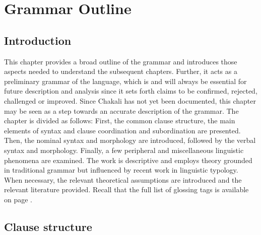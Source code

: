 \chapter{Grammar Outline}
\label{sec:gramsketch}


\section{Introduction}
\label{sec:Introduction}


This chapter  provides a broad outline of the grammar and introduces those
aspects needed to understand the subsequent chapters. Further, it acts as a
preliminary grammar of the language, which is and will always be essential for
future description and analysis since it sets forth claims to be confirmed,
rejected, challenged or improved.  Since Chakali  has not yet been  documented,
this chapter may be seen as a step towards an accurate description of the 
grammar. The chapter is divided as follows: First, the common clause structure,
the main elements of syntax and clause coordination and subordination are
presented. Then, the nominal syntax and morphology are introduced,  followed by
the verbal syntax and morphology. Finally, a few peripheral and miscellaneous
linguistic phenomena are examined.  The work is descriptive and employs theory
grounded in traditional grammar but  influenced by  recent work in linguistic
typology. When necessary, the relevant theoretical assumptions are introduced
and the relevant literature provided. Recall that the full list of glossing tags
is available on page \pageref{sec-ABB}.





\section{Clause structure}
\label{sec:GRM-nom}

